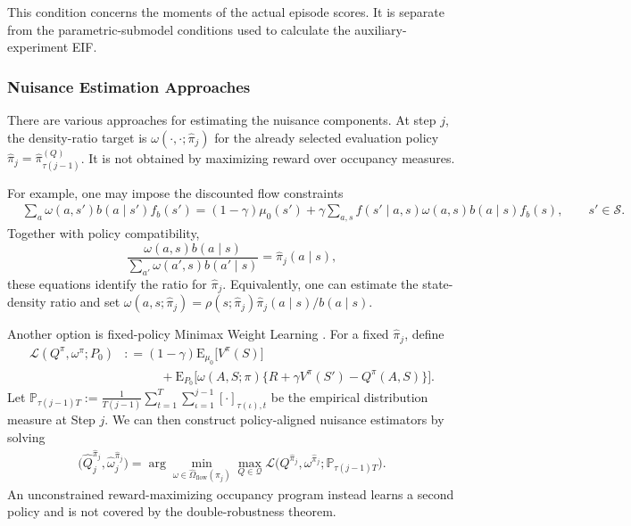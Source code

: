 \documentclass[12pt]{article}
\theoremstyle{remark}\newtheorem{remark}[theorem]{Remark}\theoremstyle{plain}
\newcommand{\E}{\mathrm{E}}
\newcommand{\bcdot}{\boldsymbol{\cdot}}
\begin{document}
This condition concerns the moments of the actual episode scores.  It
is separate from the parametric-submodel conditions used to calculate
the auxiliary-experiment EIF.

\subsubsection{Nuisance Estimation Approaches}

There are various approaches for estimating the nuisance components.
At step $j$, the density-ratio target is
$\omega(\cdot,\cdot;\widehat\pi_j)$ for the already selected
evaluation policy $\widehat\pi_j=\widehat\pi_{\tau(j-1)}^{(Q)}$.
It is not obtained by maximizing reward over occupancy measures.

For example, one may impose the discounted flow constraints
\[
    \begin{aligned}
        & \sum_{a} \omega(a, s') b(a \mid s') f_b(s') = (1 - \gamma) \mu_0(s') + \gamma \sum_{a, s}
        f(s' \mid a, s) \omega(a, s) b(a \mid s) f_b(s),
        \qquad s'\in\mathcal S.
    \end{aligned}
\]
Together with policy compatibility,
\[
    \frac{\omega(a,s)b(a\mid s)}
    {\sum_{a'}\omega(a',s)b(a'\mid s)}
    =\widehat\pi_j(a\mid s),
\]
these equations identify the ratio for $\widehat\pi_j$.  Equivalently,
one can estimate the state-density ratio and set
$\omega(a,s;\widehat\pi_j)
 =\rho(s;\widehat\pi_j)\widehat\pi_j(a\mid s)/b(a\mid s)$.

Another option is fixed-policy Minimax Weight Learning
\citep{nachum2019dualdice,duan2020minimax,uehara2020minimax}.  For a
fixed $\widehat\pi_j$, define
\[
    \begin{aligned}
        \mathcal{L} (Q^{\pi}, \omega^{\pi}; P_0) & : = (1 - \gamma) \E_{\mu_0} \big[ V^\pi(S)\big] \\
        &~~~~~~~~~~~~~ + \E_{P_0} \Big[ \omega(A, S ; \pi)
        \Big\{ R + \gamma V^\pi(S') - Q^\pi(A,S) \Big\} \Big].
    \end{aligned}
\]
Let $\mathbb{P}_{\tau(j - 1) T} :=  \frac{1}{T (j - 1)} \sum_{t = 1}^T \sum_{\iota = 1}^{j - 1} [\bcdot]_{\tau(\iota), t}$ be the empirical distribution measure at Step $j$.
We can then construct policy-aligned nuisance estimators by solving
\begin{equation}\label{eq:empirical_lag_for_nui}
    \begin{aligned}
        \big( \widehat{Q}_{j}^{\widehat\pi_j},
        \widehat{\omega}_{j}^{\widehat\pi_j} \big)
        = \arg\min_{\omega \in \widehat{\Omega}_{\text{flow}}(\widehat\pi_j)}
        \max_{Q \in \mathcal{Q}}
        \mathcal{L} \big(Q^{\widehat\pi_j},
        \omega^{\widehat\pi_j};
        \mathbb{P}_{\tau(j - 1) T} \big).
    \end{aligned}
\end{equation}
An unconstrained reward-maximizing occupancy program instead learns a
second policy and is not covered by the double-robustness theorem.
\end{document}
